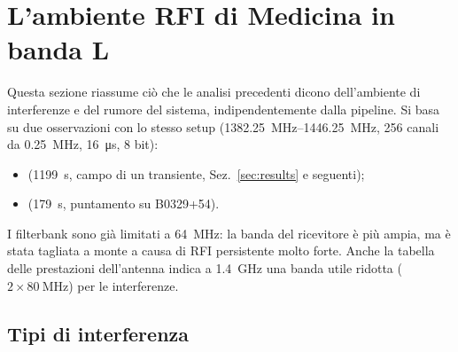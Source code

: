 \FloatBarrier
\section{L'ambiente RFI di Medicina in banda L}
\label{sec:rfienv}

Questa sezione riassume ciò che le analisi precedenti dicono dell'ambiente di interferenze e del rumore del sistema,
indipendentemente dalla pipeline. Si basa su due osservazioni con lo stesso setup
(\SIrange{1382.25}{1446.25}{\mega\hertz}, 256 canali da \SI{0.25}{\mega\hertz}, \SI{16}{\micro\second}, 8 bit):
\begin{itemize}
  \item {} (\SI{1199}{\second}, campo di un transiente, Sez.~\ref{sec:results} e seguenti);
  \item {} (\SI{179}{\second}, puntamento su B0329+54).
\end{itemize}
I filterbank sono già limitati a \SI{64}{\mega\hertz}: la banda del ricevitore è più ampia, ma è stata tagliata a
monte a causa di RFI persistente molto forte. Anche la tabella delle prestazioni dell'antenna indica a
\SI{1.4}{\giga\hertz} una banda utile ridotta ($2\times\SI{80}{\mega\hertz}$) per le interferenze.

\subsection{Tipi di interferenza}


